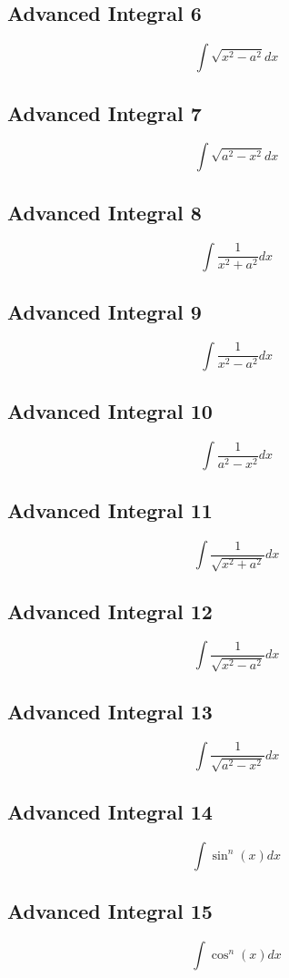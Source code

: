 \documentclass{article}
\begin{document}
\subsection*{Advanced Integral 6}
$$\int\sqrt{x^2-a^2}dx$$
\subsection*{Advanced Integral 7}
$$\int\sqrt{a^2-x^2}dx$$
\subsection*{Advanced Integral 8}
$$\int\frac{1}{x^2+a^2}dx$$
\subsection*{Advanced Integral 9}
$$\int\frac{1}{x^2-a^2}dx$$
\subsection*{Advanced Integral 10}
$$\int\frac{1}{a^2-x^2}dx$$
\subsection*{Advanced Integral 11}
$$\int\frac{1}{\sqrt{x^2+a^2}}dx$$
\subsection*{Advanced Integral 12}
$$\int\frac{1}{\sqrt{x^2-a^2}}dx$$
\subsection*{Advanced Integral 13}
$$\int\frac{1}{\sqrt{a^2-x^2}}dx$$
\subsection*{Advanced Integral 14}
$$\int\sin^n(x)dx$$
\subsection*{Advanced Integral 15}
$$\int\cos^n(x)dx$$
\end{document}
